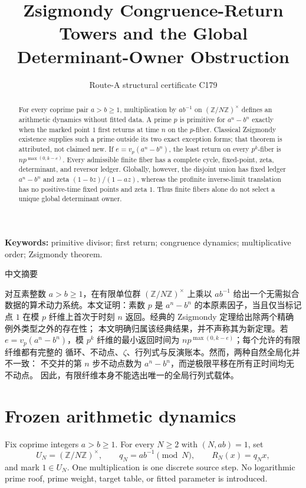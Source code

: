 \documentclass[10pt]{article}
\title{\vspace{-1.5em}Zsigmondy Congruence-Return Towers and the Global Determinant-Owner Obstruction}
\author{Route-A structural certificate C179}
\date{}
\begin{document}
\maketitle
\begin{abstract}
For every coprime pair $a>b\ge1$, multiplication by $ab^{-1}$ on
$(\mathbb Z/N\mathbb Z)^\times$ defines an arithmetic dynamics without
fitted data.  A prime $p$ is primitive for $a^n-b^n$ exactly when the marked
point $1$ first returns at time $n$ on the $p$-fiber.  Classical Zsigmondy
existence supplies such a prime outside its two exact exception forms; that
theorem is attributed, not claimed new.  If $e=v_p(a^n-b^n)$, the least
return on every $p^k$-fiber is $np^{\max(0,k-e)}$.  Every admissible finite
fiber has a complete cycle, fixed-point, zeta, determinant, and reversor
ledger.  Globally, however, the disjoint union has fixed ledger $a^n-b^n$
and zeta $(1-bz)/(1-az)$, whereas the profinite inverse-limit translation
has no positive-time fixed points and zeta $1$.  Thus finite fibers alone do
not select a unique global determinant owner.
\end{abstract}
\noindent\textbf{Keywords:} primitive divisor; first return; congruence
dynamics; multiplicative order; Zsigmondy theorem.

\begin{otherlanguage}{chinese-simplified}
\begin{center}{\large 中文摘要}
\end{center}
对互素整数 $a>b\ge1$，在有限单位群 $(\mathbb Z/N\mathbb Z)^\times$ 上乘以
$ab^{-1}$ 给出一个无需拟合数据的算术动力系统。本文证明：素数 $p$ 是
$a^n-b^n$ 的本原素因子，当且仅当标记点 $1$ 在模 $p$ 纤维上首次于时刻
$n$ 返回。经典的
\foreignlanguage{english}{Zsigmondy} 定理给出除两个精确例外类型之外的存在性；
本文明确归属该经典结果，并不声称其为新定理。若 $e=v_p(a^n-b^n)$，模
$p^k$ 纤维的最小返回时间为 $np^{\max(0,k-e)}$；每个允许的有限纤维都有完整的
循环、不动点、$\zeta$、行列式与反演账本。然而，两种自然全局化并不一致：
不交并的第 $n$ 步不动点数为 $a^n-b^n$，而逆极限平移在所有正时间均无不动点。
因此，有限纤维本身不能选出唯一的全局行列式载体。
\end{otherlanguage}

\section{Frozen arithmetic dynamics}
Fix coprime integers $a>b\ge1$.  For every $N\ge2$ with $(N,ab)=1$, set
\[
U_N=(\mathbb Z/N\mathbb Z)^\times,\qquad
q_N=ab^{-1}\pmod N,\qquad R_N(x)=q_Nx,
\]
and mark $1\in U_N$.  One multiplication is one discrete source step.  No
logarithmic prime roof, prime weight, target table, or fitted parameter is
introduced.
\end{document}
